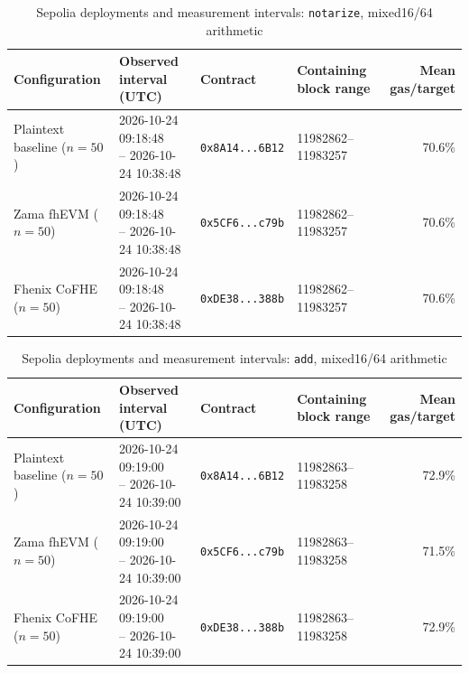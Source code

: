 \begin{table}[!t]
\caption{Sepolia deployments and measurement intervals: \texttt{notarize}, mixed16/64 arithmetic}
\label{tab:sepolia-experiment-deployments-reference-mixed-oct24-notarize}
\centering
\footnotesize
\setlength{\tabcolsep}{4pt}
\begin{tabular}{|l|l|l|l|r|}
\hline
\textbf{Configuration} &
\textbf{Observed interval (UTC)} &
\textbf{Contract} &
\textbf{Containing block range} &
\textbf{Mean gas/target} \\
\hline
Plaintext baseline (\(n=50\)) &
\shortstack[l]{2026-10-24 09:18:48 \\ -- 2026-10-24 10:38:48} &
\texttt{0x8A14...6B12} &
11982862--11983257 &
70.6\% \\
\hline
Zama fhEVM (\(n=50\)) &
\shortstack[l]{2026-10-24 09:18:48 \\ -- 2026-10-24 10:38:48} &
\texttt{0x5CF6...c79b} &
11982862--11983257 &
70.6\% \\
\hline
Fhenix CoFHE (\(n=50\)) &
\shortstack[l]{2026-10-24 09:18:48 \\ -- 2026-10-24 10:38:48} &
\texttt{0xDE38...388b} &
11982862--11983257 &
70.6\% \\
\hline
\end{tabular}
\end{table}

\begin{table}[!t]
\caption{Sepolia deployments and measurement intervals: \texttt{add}, mixed16/64 arithmetic}
\label{tab:sepolia-experiment-deployments-reference-mixed-oct24-add}
\centering
\footnotesize
\setlength{\tabcolsep}{4pt}
\begin{tabular}{|l|l|l|l|r|}
\hline
\textbf{Configuration} &
\textbf{Observed interval (UTC)} &
\textbf{Contract} &
\textbf{Containing block range} &
\textbf{Mean gas/target} \\
\hline
Plaintext baseline (\(n=50\)) &
\shortstack[l]{2026-10-24 09:19:00 \\ -- 2026-10-24 10:39:00} &
\texttt{0x8A14...6B12} &
11982863--11983258 &
72.9\% \\
\hline
Zama fhEVM (\(n=50\)) &
\shortstack[l]{2026-10-24 09:19:00 \\ -- 2026-10-24 10:39:00} &
\texttt{0x5CF6...c79b} &
11982863--11983258 &
71.5\% \\
\hline
Fhenix CoFHE (\(n=50\)) &
\shortstack[l]{2026-10-24 09:19:00 \\ -- 2026-10-24 10:39:00} &
\texttt{0xDE38...388b} &
11982863--11983258 &
72.9\% \\
\hline
\end{tabular}
\end{table}

